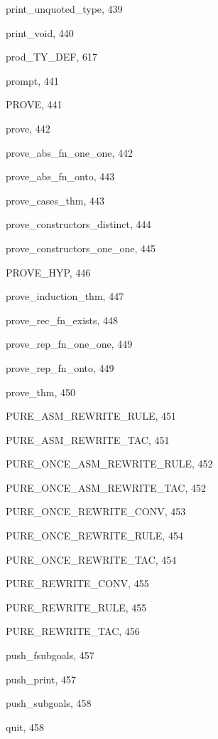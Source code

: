 \begin{theindex}
  \item {\ptt print\_unquoted\_type}, 439
  \item {\ptt print\_void}, 440
  \item {\ptt prod\_TY\_DEF}, 617
  \item {\ptt prompt}, 441
  \item {\ptt PROVE}, 441
  \item {\ptt prove}, 442
  \item {\ptt prove\_abs\_fn\_one\_one}, 442
  \item {\ptt prove\_abs\_fn\_onto}, 443
  \item {\ptt prove\_cases\_thm}, 443
  \item {\ptt prove\_constructors\_distinct}, 444
  \item {\ptt prove\_constructors\_one\_one}, 445
  \item {\ptt PROVE\_HYP}, 446
  \item {\ptt prove\_induction\_thm}, 447
  \item {\ptt prove\_rec\_fn\_exists}, 448
  \item {\ptt prove\_rep\_fn\_one\_one}, 449
  \item {\ptt prove\_rep\_fn\_onto}, 449
  \item {\ptt prove\_thm}, 450
  \item {\ptt PURE\_ASM\_REWRITE\_RULE}, 451
  \item {\ptt PURE\_ASM\_REWRITE\_TAC}, 451
  \item {\ptt PURE\_ONCE\_ASM\_REWRITE\_RULE}, 452
  \item {\ptt PURE\_ONCE\_ASM\_REWRITE\_TAC}, 452
  \item {\ptt PURE\_ONCE\_REWRITE\_CONV}, 453
  \item {\ptt PURE\_ONCE\_REWRITE\_RULE}, 454
  \item {\ptt PURE\_ONCE\_REWRITE\_TAC}, 454
  \item {\ptt PURE\_REWRITE\_CONV}, 455
  \item {\ptt PURE\_REWRITE\_RULE}, 455
  \item {\ptt PURE\_REWRITE\_TAC}, 456
  \item {\ptt push\_fsubgoals}, 457
  \item {\ptt push\_print}, 457
  \item {\ptt push\_subgoals}, 458

  \indexspace

  \item {\ptt quit}, 458

  \indexspace


\end{theindex}
